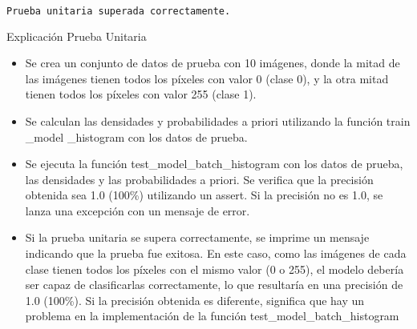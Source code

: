 \documentclass[spanish]{article}
\begin{document}
\begin{lstlisting}[language=Python, caption=Salida Prueba Test Model Batch]

Prueba unitaria superada correctamente.

\end{lstlisting}

Explicación Prueba Unitaria
\begin{itemize}
    \item Se crea un conjunto de datos de prueba con 10 imágenes, donde la mitad de las imágenes tienen todos los píxeles con valor 0 (clase 0), y la otra mitad tienen todos los píxeles con valor 255 (clase 1).
    \item Se calculan las densidades y probabilidades a priori utilizando la función train \_model \_histogram con los datos de prueba.
      \item Se ejecuta la función test\_model\_batch\_histogram con los datos de prueba, las densidades y las probabilidades a priori.
Se verifica que la precisión obtenida sea 1.0 (100\%) utilizando un assert. Si la precisión no es 1.0, se lanza una excepción con un mensaje de error.
\item Si la prueba unitaria se supera correctamente, se imprime un mensaje indicando que la prueba fue exitosa.
En este caso, como las imágenes de cada clase tienen todos los píxeles con el mismo valor (0 o 255), el modelo debería ser capaz de clasificarlas correctamente, lo que resultaría en una precisión de 1.0 (100\%). Si la precisión obtenida es diferente, significa que hay un problema en la implementación de la función test\_model\_batch\_histogram
    
\end{itemize}

\newpage
\end{document}
